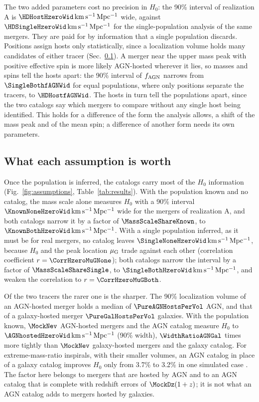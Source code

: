 \documentclass[aps,prd,reprint,superscriptaddress,nofootinbib,nolongbibliography,floatfix]{revtex4-2}
\newcommand{\kms}{\,\mathrm{km\,s^{-1}\,Mpc^{-1}}}
\newcommand{\fagn}{f_{\rm AGN}}
\begin{document}
The two added parameters cost no precision in $H_0$: the 90\% interval of realization A is $\HDHostHzeroWid\kms$ wide, against $\HDSingleHzeroWid\kms$ for the single-population analysis of the same mergers. %
They are paid for by information that a single population discards. %
Positions assign hosts only statistically, since a localization volume holds many candidates of either tracer (Sec.~\ref{sec:worth}).
A merger near the upper mass peak with positive effective spin is more likely AGN-hosted wherever it lies, so masses and spins tell the hosts apart: the 90\% interval of $\fagn$ narrows from $\SingleBothfAGNWid$ for equal populations, where only positions separate the tracers, to $\HDHostfAGNWid$. %
The hosts in turn tell the populations apart, since the two catalogs say which mergers to compare without any single host being identified.
This holds for a difference of the form the analysis allows, a shift of the mass peak and of the mean spin; a difference of another form needs its own parameters.

\subsection{What each assumption is worth}
\label{sec:worth}

Once the population is inferred, the catalogs carry most of the $H_0$ information (Fig.~\ref{fig:assumptions}, Table~\ref{tab:results}). %
With the population known and no catalog, the mass scale alone measures $H_0$ with a 90\% interval $\KnownNoneHzeroWid\kms$ wide for the mergers of realization A, and both catalogs narrow it by a factor of $\MassScaleShareKnown$, to $\KnownBothHzeroWid\kms$.
With a single population inferred, as it must be for real mergers, no catalog leaves $\SingleNoneHzeroWid\kms$, because $H_0$ and the peak location $\mu_{\rm G}$ trade against each other (correlation coefficient $r=\CorrHzeroMuGNone$); both catalogs narrow the interval by a factor of $\MassScaleShareSingle$, to $\SingleBothHzeroWid\kms$, and weaken the correlation to $r=\CorrHzeroMuGBoth$. %

Of the two tracers the rarer one is the sharper. %
The 90\% localization volume of an AGN-hosted merger holds a median of $\PureAGNHostsPerVol$ AGN, and that of a galaxy-hosted merger $\PureGalHostsPerVol$ galaxies.
With the population known, $\MockNev$ AGN-hosted mergers and the AGN catalog measure $H_0$ to $\AGNhostedHzeroWid\kms$ (90\% width), $\WidthRatioAGNGal$ times more tightly than $\MockNev$ galaxy-hosted mergers and the galaxy catalog. %
For extreme-mass-ratio inspirals, with their smaller volumes, an AGN catalog in place of a galaxy catalog improves $H_0$ only from 3.7\% to 3.2\% in one simulated case \cite{Zhu:2024qpp}.
The factor here belongs to mergers that are hosted by AGN and to an AGN catalog that is complete with redshift errors of $\MockDz(1+z)$; it is not what an AGN catalog adds to mergers hosted by galaxies.
\end{document}
